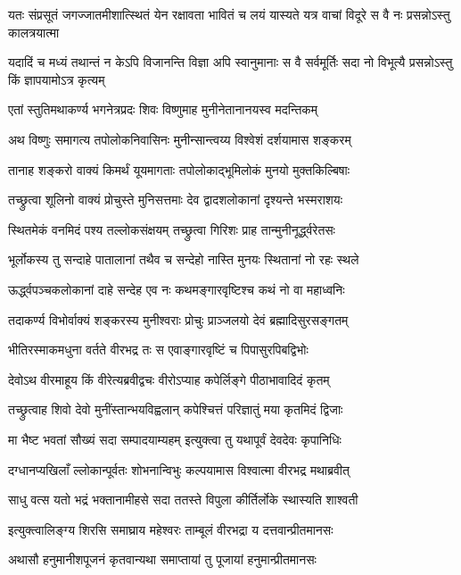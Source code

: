 \twolineshloka
{यतः संप्रसूतं जगज्जातमीशात्स्थितं येन रक्षावता भावितं च}
{लयं यास्यते यत्र वाचां विदूरे स वै नः प्रसन्नोऽस्तु कालत्रयात्मा}%

\twolineshloka
{यदादिं च मध्यं तथान्तं न केऽपि विजानन्ति विज्ञा अपि स्वानुमानाः}
{स वै सर्वमूर्तिः सदा नो विभूत्यै प्रसन्नोऽस्तु किं ज्ञापयामोऽत्र कृत्यम्}%

\twolineshloka
{एतां स्तुतिमथाकर्ण्य भगनेत्रप्रदः शिवः}
{विष्णुमाह मुनीनेतानानयस्व मदन्तिकम्}%

\twolineshloka
{अथ विष्णुः समागत्य तपोलोकनिवासिनः}
{मुनीन्सान्त्वय्य विश्वेशं दर्शयामास शङ्करम्}%

\twolineshloka
{तानाह शङ्करो वाक्यं किमर्थं यूयमागताः}
{तपोलोकाद्भूमिलोकं मुनयो मुक्तकिल्बिषाः}%

\twolineshloka
{तच्छ्रुत्वा शूलिनो वाक्यं प्रोचुस्ते मुनिसत्तमाः}
{देव द्वादशलोकानां दृश्यन्ते भस्मराशयः}%

\twolineshloka
{स्थितमेकं वनमिदं पश्य तल्लोकसंक्षयम्}
{तच्छ्रुत्वा गिरिशः प्राह तान्मुनीनूर्द्ध्वरेतसः}%

\twolineshloka
{भूर्लोकस्य तु सन्दाहे पातालानां तथैव च}
{सन्देहो नास्ति मुनयः स्थितानां नो रहः स्थले}%

\twolineshloka
{ऊर्द्ध्वपञ्चकलोकानां दाहे सन्देह एव नः}
{कथमङ्गारवृष्टिश्च कथं नो वा महाध्वनिः}%

\twolineshloka
{तदाकर्ण्य विभोर्वाक्यं शङ्करस्य मुनीश्वराः}
{प्रोचुः प्राञ्जलयो देवं ब्रह्मादिसुरसङ्गतम्}%

\twolineshloka
{भीतिरस्माकमधुना वर्तते वीरभद्र तः}
{स एवाङ्गारवृष्टिं च पिपासुरपिबद्विभोः}%

\twolineshloka
{देवोऽथ वीरमाहूय किं वीरेत्यब्रवीद्वचः}
{वीरोऽप्याह कपेर्लिङ्गे पीठाभावादिदं कृतम्}%

\twolineshloka
{तच्छ्रुत्वाह शिवो देवो मुनींस्तान्भयविह्वलान्}
{कपेश्चित्तं परिज्ञातुं मया कृतमिदं द्विजाः}%

\twolineshloka
{मा भैष्ट भवतां सौख्यं सदा सम्पादयाम्यहम्}
{इत्युक्त्वा तु यथापूर्वं देवदेवः कृपानिधिः}%

\twolineshloka
{दग्धानप्यखिलाँ ल्लोकान्पूर्वतः शोभनान्विभुः}
{कल्पयामास विश्वात्मा वीरभद्र मथाब्रवीत्}%

\twolineshloka
{साधु वत्स यतो भद्रं भक्तानामीहसे सदा}
{ततस्ते विपुला कीर्तिर्लोके स्थास्यति शाश्वती}%

\twolineshloka
{इत्युक्त्वालिङ्ग्य शिरसि समाघ्राय महेश्वरः}
{ताम्बूलं वीरभद्रा य दत्तवान्प्रीतमानसः}%

\twolineshloka
{अथासौ हनुमानीशपूजनं कृतवान्यथा}
{समाप्तायां तु पूजायां हनुमान्प्रीतमानसः}%

